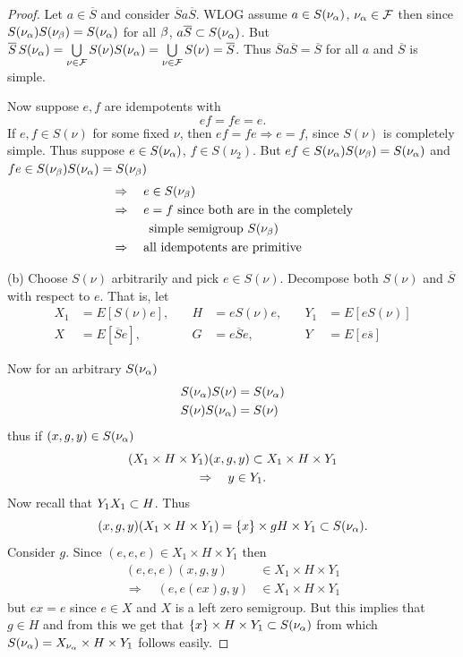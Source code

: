 \begin{proof} Let $a \in \overline S$ and consider $\overline S a
\overline S$.  WLOG assume $a \in S(\nu_\alpha)$, $\nu_\alpha \in \mathcal{F}$ then
since $S(\nu_\alpha) S(\nu_\beta) = S(\nu_\alpha)$ for all $\beta$, $a\overline S
\subset S(\nu_\alpha)$.  But $\overline S\, S(\nu_\alpha) =
\bigcup\limits_{\nu\in\mathcal{F}} S(\nu) S(\nu_\alpha) = \bigcup\limits_{\nu\in\mathcal{F}}
S(\nu) = \overline S$.  Thus $\overline S a \overline S = \overline S$
for all $a$ and $\overline S$ is simple.

     Now suppose $e,f$ are idempotents with
\[
     ef = fe = e.
\]
If $e,f \in S(\nu)$ for some fixed $\nu$, then $ef = fe \Rightarrow e = f$,
since $S(\nu)$ is completely simple.  Thus suppose $e \in S(\nu_\alpha)$,
$f \in S(\nu_2)$.  But $ef \in S(\nu_\alpha) S(\nu_\beta) = S(\nu_\alpha)$ and
$fe \in S(\nu_\beta) S(\nu_\alpha) = S(\nu_\beta)$
\[
\begin{aligned}
       &\Rightarrow \quad e \in S(\nu_\beta)                 \\
       &\Rightarrow \quad e = f \hbox{ since both are in the completely} \\
       &\phantom{\Rightarrow} \qquad \hbox{simple semigroup } S(\nu_\beta)     \\
       &\Rightarrow \quad \hbox{all idempotents are primitive}
\end{aligned}
\]

     (b)  Choose $S(\nu)$ arbitrarily and pick $e \in S(\nu)$.
Decompose both $S(\nu)$ and $\overline S$ with respect to $e$.  That
is, let
\[
\begin{alignedat}{3}
     X_1 &= E[S(\nu)e], &\quad H &= eS(\nu)e,
               &\quad Y_1 &= E[eS(\nu)]                        \\
     X &= E[\overline S e], &\quad G &= e\overline Se,
               &\quad Y &= E[e\overline s]
\end{alignedat}
\]

     Now for an arbitrary $S(\nu_\alpha)$
\[
\begin{aligned}
       S(\nu_\alpha) S(\nu) &= S(\nu_\alpha)               \\
       S(\nu) S(\nu_\alpha) &= S(\nu)
\end{aligned}
\]
thus if $(x,g,y) \in S(\nu_\alpha)$
\[
\begin{gathered}
       (X_1 \times H \times Y_1) (x,g,y) \subset X_1 \times H \times Y_1           \\
       \Rightarrow \quad y \in Y_1.
\end{gathered}
\]
Now recall that $Y_1 X_1 \subset H$.  Thus
\[
     (x,g,y) (X_1 \times H \times Y_1) = \{ x \} 
	\times gH \times Y_1 \subset S(\nu_\alpha).
\]
Consider $g$.  Since $(e,e,e) \in X_1 \times H \times Y_1$ then
\[
\begin{aligned}
       (e,e,e)(x,g,y) &\in X_1 \times H \times Y_1         \\
       \Rightarrow \quad (e,e(ex)g,y) &\in X_1 \times H \times Y_1
\end{aligned}
\]
but $ex = e$ since $e \in X$ and $X$ is a left zero semigroup.  But
this implies that $g \in H$ and from this we get that $\{ x \} \times H \times
Y_1 \subset S(\nu_\alpha)$ from which $S(\nu_\alpha) = X_{\nu_\alpha} \times H \times Y_1$
follows easily.


\end{proof}
